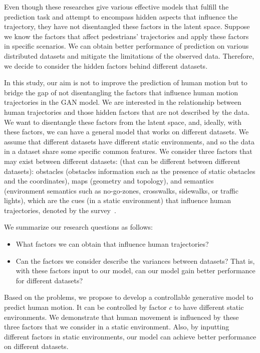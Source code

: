 Even though these researches give various effective models that fulfill the prediction task and attempt to encompass hidden aspects that influence the trajectory, they have not disentangled these factors in the latent space. Suppose we know the factors that affect pedestrians' trajectories and apply these factors in specific scenarios. We can obtain better performance of prediction on various distributed datasets and mitigate the limitations of the observed data. Therefore, we decide to consider the hidden factors behind different datasets.

In this study, our aim is not to improve the prediction of human motion but to bridge the gap of not disentangling the factors that influence human motion trajectories in the GAN model. We are interested in the relationship between human trajectories and those hidden factors that are not described by the data. We want to disentangle these factors from the latent space, and, ideally, with these factors, we can have a general model that works on different datasets. We assume that different datasets have different static environments, and so the data in a dataset share some specific common features. We consider three factors that may exist between different datasets: (that can be different between different datasets): obstacles (obstacles information such as the presence of static obstacles and the coordinates), maps (geometry and topology), and semantics (environment semantics such as no-go-zones, crosswalks, sidewalks, or traffic lights), which are the cues (in a static environment) that influence human trajectories, denoted by the survey~\cite{humanmotionsurvey}.

We summarize our research questions as follows:

\begin{itemize}
  \item What factors we can obtain that influence human trajectories?
  \item Can the factors we consider describe the variances between datasets? That is, with these factors input to our model, can our model gain better performance for different datasets?
\end{itemize}

Based on the problems, we propose to develop a controllable generative model to predict human motion. It can be controlled by factor $c$ to have different static environments. We demonstrate that human movement is influenced by these three factors that we consider in a static environment. Also, by inputting different factors in static environments, our model can achieve better performance on different datasets.
